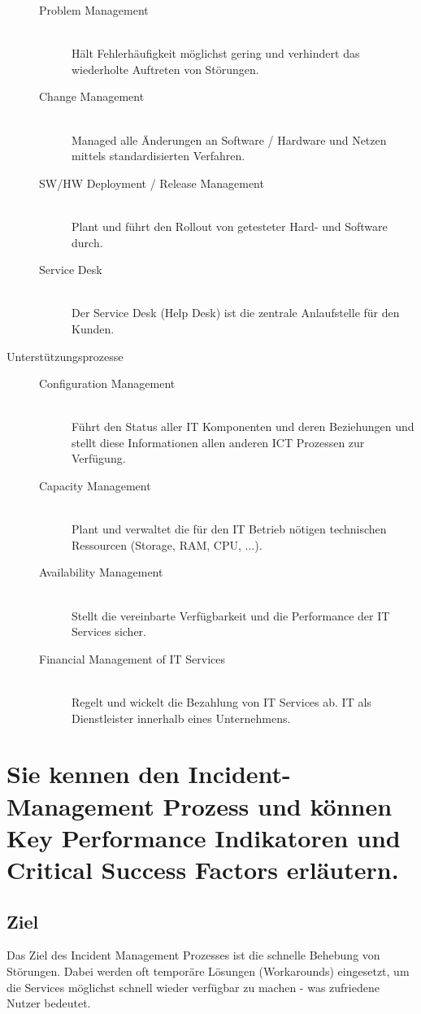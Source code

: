 \begin{description}
\begin{description}
		\item[Problem Management] \hfill \\
			Hält Fehlerhäufigkeit möglichst gering und verhindert das wiederholte Auftreten von Störungen.
		\item[Change Management] \hfill \\
			Managed alle Änderungen an Software / Hardware und Netzen mittels standardisierten Verfahren.		
		\item[SW/HW Deployment / Release Management] \hfill \\
			Plant und führt den Rollout von getesteter Hard- und Software durch.		
		\item[Service Desk] \hfill \\
			Der Service Desk (Help Desk) ist die zentrale Anlaufstelle für den Kunden.		
	\end{description}
	\item[Unterstützungsprozesse] \hfill
	\begin{description}
		\item[Configuration Management] \hfill \\
			Führt den Status aller IT Komponenten und deren Beziehungen und stellt diese Informationen allen anderen ICT Prozessen zur Verfügung.
		\item[Capacity Management] \hfill \\
			Plant und verwaltet die für den IT Betrieb nötigen technischen Ressourcen (Storage, RAM, CPU, ...).
		\item[Availability Management] \hfill \\
			Stellt die vereinbarte Verfügbarkeit und die Performance der IT Services sicher.
		\item[Financial Management of IT Services] \hfill \\
			Regelt und wickelt die Bezahlung von IT Services ab. IT als Dienstleister innerhalb eines Unternehmens.
	\end{description}
\end{description}

\section{Sie kennen den Incident-Management Prozess und können Key Performance Indikatoren und Critical Success Factors erläutern.}
\label{sec:incident-management}

\subsection{Ziel}
Das Ziel des Incident Management Prozesses ist die schnelle Behebung von Störungen. Dabei werden oft temporäre Lösungen (Workarounds) eingesetzt, um die Services möglichst schnell wieder verfügbar zu machen - was zufriedene Nutzer bedeutet.

